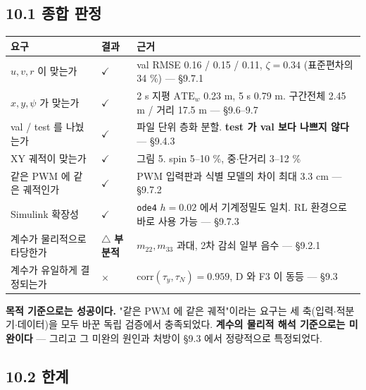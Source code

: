 \documentclass[10pt,a4paper]{article}
\begin{document}
\subsection*{10.1 종합 판정}

\begin{center}\footnotesize\setlength{\tabcolsep}{3pt}
\begin{tabular}{@{}p{3.49cm}lp{10.07cm}@{}}
\toprule
\textbf{요구} & \textbf{결과} & \textbf{근거} \\
\midrule
$u, v, r$ 이 맞는가 & $\checkmark$ & val RMSE 0.16 / 0.15 / 0.11, $\zeta = 0.34$ (표준편차의 34 \%) --- \S{}9.7.1 \\
$x, y, \psi$ 가 맞는가 & $\checkmark$ & 2 s 지평 $\mathrm{ATE}_w$ 0.23 m, 5 s 0.79 m. 구간전체 2.45 m / 거리 17.5 m --- \S{}9.6--9.7 \\
val / test 를 나눴는가 & $\checkmark$ & 파일 단위 층화 분할. \textbf{test 가 val 보다 나쁘지 않다} --- \S{}9.4.3 \\
XY 궤적이 맞는가 & $\checkmark$ & 그림 5. spin 5--10 \%, 중$\cdot$단거리 3--12 \% \\
같은 PWM 에 같은 궤적인가 & $\checkmark$ & PWM 입력판과 식별 모델의 차이 최대 3.3 cm --- \S{}9.7.2 \\
Simulink 확장성 & $\checkmark$ & \texttt{ode4} $h=0.02$ 에서 기계정밀도 일치. RL 환경으로 바로 사용 가능 --- \S{}9.7.3 \\
계수가 물리적으로 타당한가 & $\triangle$ \textbf{부분적} & $m_{22}, m_{33}$ 과대, 2차 감쇠 일부 음수 --- \S{}9.2.1 \\
계수가 유일하게 결정되는가 & $\times$ & $\mathrm{corr}(\tau_y,\tau_N) = 0.959$, D 와 F3 이 동등 --- \S{}9.3 \\
\bottomrule
\end{tabular}
\end{center}

\textbf{목적 기준으로는 성공이다.} "같은 PWM 에 같은 궤적"이라는 요구는 세 축(입력$\cdot$적분기$\cdot$데이터)을 모두 바꾼 독립 검증에서 충족되었다. \textbf{계수의 물리적 해석 기준으로는 미완이다} --- 그리고 그 미완의 원인과 처방이 \S{}9.3 에서 정량적으로 특정되었다.

\subsection*{10.2 한계}
\end{document}

